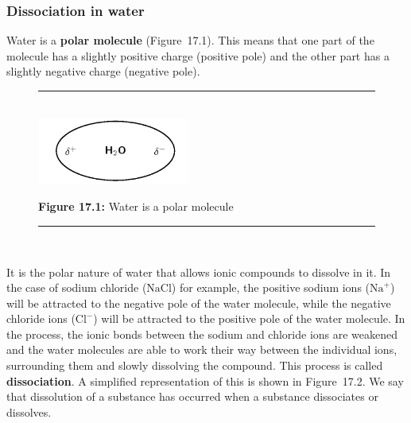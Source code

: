             \subsubsection{ Dissociation in water}
            \nopagebreak
        \label{m38720*id335324}Water is a \textbf{polar molecule} (Figure~17.1). This means that one part of the molecule has a slightly positive charge (positive pole) and the other part has a slightly negative charge (negative pole).\par 
    \setcounter{subfigure}{0}
	\begin{figure}[H] %
    \begin{center}
    \rule[.1in]{\figurerulewidth}{.005in} \\
        \label{m38720*uid20!!!underscore!!!media}\label{m38720*uid20!!!underscore!!!printimage}\includegraphics[width=5cm]{col11305.imgs/m38720_CG10C8_001.png} %
      \vspace{2pt}
    \vspace{\rubberspace}\par \begin{cnxcaption}
	  \small \textbf{Figure 17.1: }Water is a polar molecule
	\end{cnxcaption}
    \vspace{.1in}
    \rule[.1in]{\figurerulewidth}{.005in} \\
    \end{center}
 \end{figure}       
        \label{m38720*id335349}It is the polar nature of water that allows ionic compounds to dissolve in it. In the case of sodium chloride ($\mathrm{NaCl}$) for example, the positive sodium ions (${\mathrm{Na}}^{+}$) will be attracted to the negative pole of the water molecule, while the negative chloride ions (${\mathrm{Cl}}^{-}$) will be attracted to the positive pole of the water molecule. In the process, the ionic bonds between the sodium and chloride ions are weakened and the water molecules are able to work their way between the individual ions, surrounding them and slowly dissolving the compound. This process is called \textbf{dissociation}. A simplified representation of this is shown in Figure~17.2. We say that dissolution of a substance has occurred when a substance dissociates or dissolves.\par 
